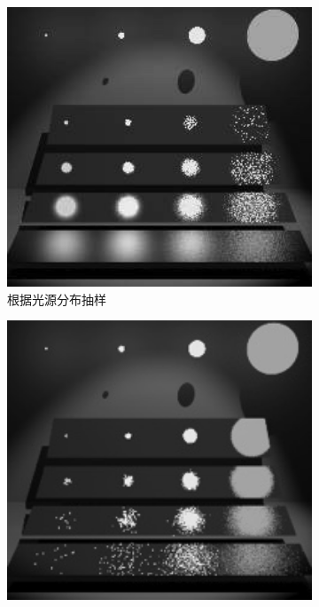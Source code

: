 \begin{figure}
	\begin{subfigure}[b]{0.328\textwidth}
		\includegraphics[width=1.0\textwidth]{figures/mc/mis-1}
		\caption{根据光源分布抽样}
	\end{subfigure}
	\begin{subfigure}[b]{0.328\textwidth}
		\includegraphics[width=1.0\textwidth]{figures/mc/mis-2}

\end{subfigure}
\end{figure}
